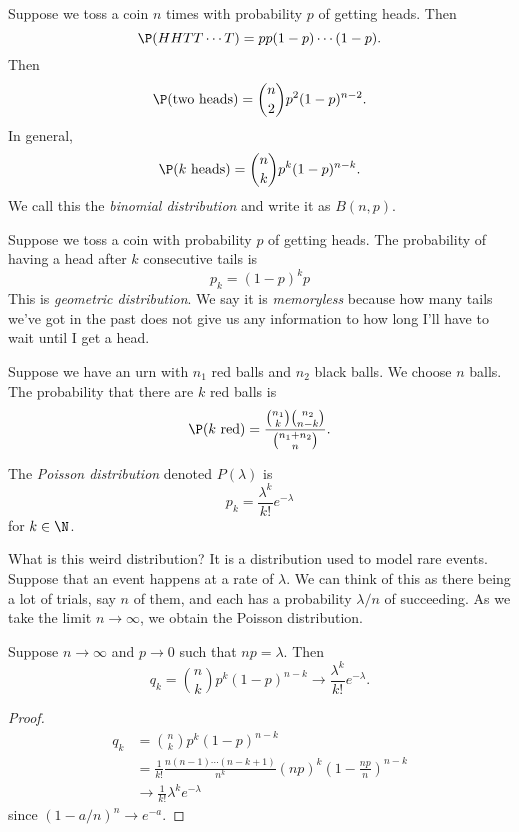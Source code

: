 \documentclass[a4paper]{article}
\begin{document}
\begin{defi}
  Suppose we toss a coin $n$ times with probability $p$ of getting heads. Then
  \[
    \P(HHTT\cdots T) = pp(1 - p)\cdots (1 - p).
  \]
  Then
  \[
    \P(\text{two heads}) = \binom{n}{2}p^2(1 - p)^{n -2}.
  \]
  In general,
  \[
    \P(k\text{ heads}) = \binom{n}{k}p^k(1 - p)^{n - k}.
  \]
  We call this the \emph{binomial distribution} and write it as $B(n, p)$.
\end{defi}

\begin{defi}
  Suppose we toss a coin with probability $p$ of getting heads. The probability of having a head after $k$ consecutive tails is
  \[
    p_k = (1- p)^k p
  \]
  This is \emph{geometric distribution}. We say it is \emph{memoryless} because how many tails we've got in the past does not give us any information to how long I'll have to wait until I get a head.
\end{defi}

\begin{defi}
  Suppose we have an urn with $n_1$ red balls and $n_2$ black balls. We choose $n$ balls. The probability that there are $k$ red balls is
  \[
    \P(k\text{ red}) = \frac{\binom{n_1}{k}\binom{n_2}{n - k}}{\binom{n_1 + n_2}{n}}.
  \]
\end{defi}

\begin{defi}
  The \emph{Poisson distribution} denoted $P(\lambda)$ is
  \[
    p_k = \frac{\lambda^k}{k!}e^{-\lambda}
  \]
  for $k\in \N$.
\end{defi}
What is this weird distribution? It is a distribution used to model rare events. Suppose that an event happens at a rate of $\lambda$. We can think of this as there being a lot of trials, say $n$ of them, and each has a probability $\lambda/n$ of succeeding. As we take the limit $n\to \infty$, we obtain the Poisson distribution.

\begin{thm}
  Suppose $n\to \infty$ and $p\to 0$ such that $np = \lambda$. Then
  \[
    q_k = \binom{n}{k}p^k(1 -p)^{n - k} \to \frac{\lambda^k}{k!}e^{-\lambda}.
  \]
\end{thm}

\begin{proof}
\begin{align*}
  q_k &= \binom{n}{k}p^k(1 - p)^{n - k}\\
  &= \frac{1}{k!} \frac{n(n - 1)\cdots(n - k + 1)}{n^k}(np)^k \left(1 - \frac{np}{n}\right)^{n - k}\\
  &\to \frac{1}{k!}\lambda^ke^{-\lambda}
\end{align*}
since $(1 - a/n)^n \to e^{-a}$.
\end{proof}
\end{document}
